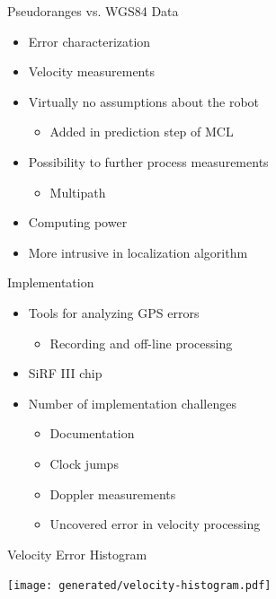 \documentclass[utf8,12pt]{beamer}
\begin{document}
\begin{frame}{Pseudoranges vs. WGS84 Data}
    \begin{itemize}
        \item Error characterization
        \item Velocity measurements
        \item Virtually no assumptions about the robot
        \begin{itemize}
            \item Added in prediction step of MCL
        \end{itemize}
        \item Possibility to further process measurements
        \begin{itemize}
            \item Multipath
        \end{itemize}
    \end{itemize}
    \vspace{0.5cm}
    \begin{itemize}
        \item Computing power
        \item More intrusive in localization algorithm
    \end{itemize}
\end{frame}

\begin{frame}{Implementation}
    \begin{itemize}
        \item Tools for analyzing GPS errors
        \begin{itemize}
            \item Recording and off-line processing
        \end{itemize}
        \item SiRF III chip
        \item Number of implementation challenges
        \begin{itemize}
            \item Documentation
            \item Clock jumps
            \item Doppler measurements
            \item Uncovered error in velocity processing
        \end{itemize}
    \end{itemize}
\end{frame}

\begin{frame}[plain]{Velocity Error Histogram}
\begin{center}
\centerline{\texttt{[image: generated/velocity-histogram.pdf]}}
\end{center}
\end{frame}
\end{document}
